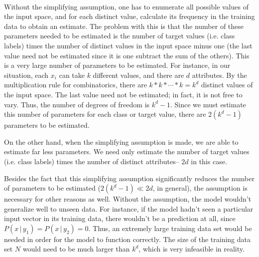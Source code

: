 \documentclass[12pt]{article}
\begin{document}
	\paragraph{}
	Without the simplifying assumption, one has to enumerate all possible values of the input space, and for each distinct value, calculate its frequency in the training data to obtain an estimate. The problem with this is that the number of these parameters needed to be estimated is the number of target values (i.e. class labels) times the number of distinct values in the input space minus one (the last value need not be estimated since it is one subtract the sum of the others). This is a very large number of parameters to be estimated. For instance, in our situation, each $x_i$ can take $k$ different values, and there are $d$ attributes. By the multiplication rule for combinatorics, there are $k * k * \cdots * k = k^d$ distinct values of the input space. The last value need not be estimated; in fact, it is not free to vary. Thus, the number of degrees of freedom is $k^{d} - 1$. Since we must estimate this number of parameters for each class or target value, there are $2(k^{d} - 1)$ parameters to be estimated. \par
	On the other hand, when the simplifying assumption is made, we are able to estimate far less parameters. We need only estimate the number of target values (i.e. class labels) times the number of distinct attributes-- $2d$ in this case. \par
	Besides the fact that this simplifying assumption significantly reduces the number of parameters to be estimated ($2(k^{d} - 1) \ll 2d$, in general), the assumption is necessary for other reasons as well. Without the assumption, the model wouldn't generalize well to unseen data. For instance, if the model hadn't seen a particular input vector in its training data, there wouldn't be a prediction at all, since $P(x \, \vert \, y_{1}) = P(x \, \vert \, y_{2})= 0$. Thus, an extremely large training data set would be needed in order for the model to function correctly. The size of the training data set $N$ would need to be much larger than $k^{d}$, which is very infeasible in reality. 
	
\end{document}
